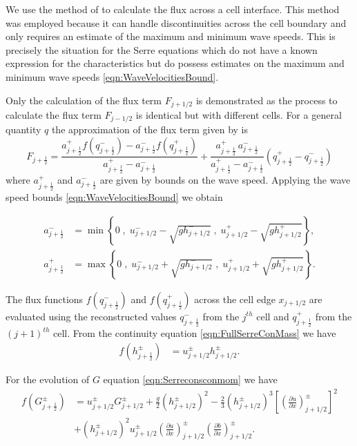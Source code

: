 We use the method of \citet{Kurganov-etal-2001-707} to calculate the flux across a cell interface. This method was employed because it can handle discontinuities across the cell boundary and only requires an estimate of the maximum and minimum wave speeds. This is precisely the situation for the Serre equations which do not have a known expression for the characteristics but do possess estimates on the maximum and minimum wave speeds \eqref{eqn:WaveVelocitiesBound}.

Only the calculation of the flux term $F_{j+1/2}$ is demonstrated as the process to calculate the flux term $F_{j-1/2}$ is identical but with different cells. For a general quantity $q$ the approximation of the flux term given by \citet{Kurganov-etal-2001-707} is
\begin{equation}\label{eqn:HLL_flux}
F_{j+\frac{1}{2}} = \dfrac{a^+_{j+\frac{1}{2}} f\left(q^-_{j+\frac{1}{2}}\right) - a^-_{j+\frac{1}{2}} f\left(q^+_{j+\frac{1}{2}}\right)}{a^+_{j+\frac{1}{2}} - a^-_{j+\frac{1}{2}}}  + \dfrac{a^+_{j+\frac{1}{2}} \, a^-_{j+\frac{1}{2}}}{a^+_{j+\frac{1}{2}} - a^-_{j+\frac{1}{2}}} \left(  q^+_{j+\frac{1}{2}} - q^-_{j+\frac{1}{2}} \right)
\end{equation}
where $a^+_{j+\frac{1}{2}}$ and $a^-_{j+\frac{1}{2}}$ are given by bounds on the wave speed. Applying the wave speed bounds \eqref{eqn:WaveVelocitiesBound} we obtain

\begin{align}
a^-_{j+\frac{1}{2}} &= \min\left\lbrace 0\;,\;  u^-_{j + 1/2} - \sqrt{g h^-_{j + 1/2}}  \;,\;u^+_{j + 1/2} - \sqrt{g h^+_{j + 1/2}} \right\rbrace  ,\\
a^+_{j+\frac{1}{2}} &= \max\left\lbrace 0 \;,\;  u^-_{j + 1/2} + \sqrt{g h^-_{j + 1/2}}  \;,\;u^+_{j + 1/2} + \sqrt{g h^+_{j + 1/2}} \right\rbrace .
\label{eqn:WaveSpeedBoundsFluxApprox}
\end{align}

The flux functions $f(q^-_{j+\frac{1}{2}})$ and $f(q^+_{j+\frac{1}{2}})$ across the cell edge $x_{j+1/2}$ are evaluated using the reconstructed values $q^-_{j+\frac{1}{2}}$ from the $j^{th}$ cell and $q^+_{j+\frac{1}{2}}$ from the $(j+1)^{th}$ cell. From the continuity equation \eqref{eqn:FullSerreConMass} we have
\begin{align*}
f\left(h^\pm_{j+\frac{1}{2}}\right) &= u^\pm_{j + 1/2}  h^\pm_{j + 1/2}.
\end{align*}

For the evolution of $G$ equation \eqref{eqn:Serreconsconmom} we have 
\begin{align}
f\left(G^\pm_{j+\frac{1}{2}}\right) &=  u^\pm_{j + 1/2} G^\pm_{j + 1/2}  + \frac{g}{2}\left(h^\pm_{j + 1/2} \right)^2 - \frac{2}{3}\left(h^\pm_{j + 1/2}\right)^3 \left[\left(\frac{\partial {u}}{\partial x} \right)^\pm_{j + 1/2} \right]^2 \nonumber\\ &+ \left(h^\pm_{j + 1/2}\right)^2 u^\pm_{j + 1/2} \left(\frac{\partial {u}}{\partial x} \right)^\pm_{j + 1/2} \left(\frac{\partial b}{\partial x} \right)^\pm_{j + 1/2} .
\label{eqn:FluxIrrotNum}
\end{align}

